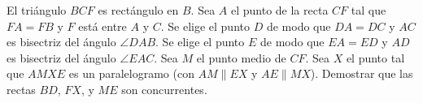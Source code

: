 El triángulo $BCF$ es rectángulo en $B$. Sea $A$ el punto de la recta $CF$ tal que $FA = FB$ y $F$ está entre $A$ y $C$. Se elige el punto $D$ de modo que $DA = DC$ y $AC$ es bisectriz del ángulo $\angle DAB$. Se elige el punto $E$ de modo que $EA = ED$ y $AD$ es bisectriz del ángulo $\angle EAC$. Sea $M$ el punto medio de $CF$. Sea $X$ el punto tal que $AMXE$ es un paralelogramo (con $AM \parallel EX$ y $AE \parallel MX$). Demostrar que las rectas $BD$, $FX$, y $ME$ son concurrentes.